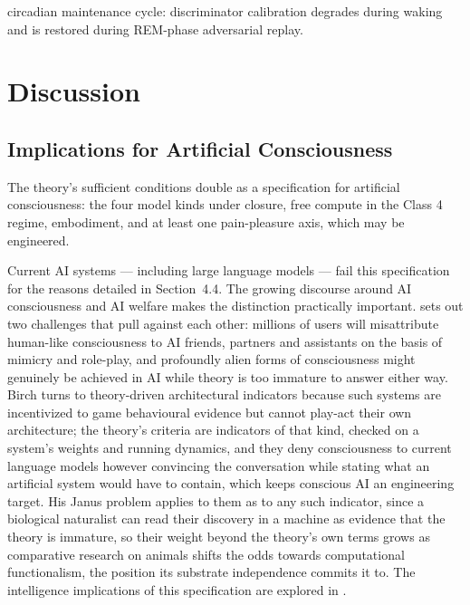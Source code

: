\documentclass[12pt]{article}
\begin{document}
circadian maintenance cycle: discriminator calibration degrades during waking and is restored during REM-phase adversarial replay.


\section{Discussion}



\subsection{Implications for Artificial Consciousness}


The theory's sufficient conditions double as a specification for artificial consciousness: the four model kinds under closure, free compute in the Class 4 regime, embodiment, and at least one pain-pleasure axis, which may be engineered.

Current AI systems --- including large language models --- fail this specification for the reasons detailed in Section~4.4. The growing discourse around AI consciousness \citep{Butlin2023,ButlinLong2026,Schwitzgebel2025} and AI welfare \citep{Long2024,Anthropic2025} makes the distinction practically important. \citet{Birch2025} sets out two challenges that pull against each other: millions of users will misattribute human-like consciousness to AI friends, partners and assistants on the basis of mimicry and role-play, and profoundly alien forms of consciousness might genuinely be achieved in AI while theory is too immature to answer either way. Birch turns to theory-driven architectural indicators because such systems are incentivized to game behavioural evidence but cannot play-act their own architecture; the theory's criteria are indicators of that kind, checked on a system's weights and running dynamics, and they deny consciousness to current language models however convincing the conversation while stating what an artificial system would have to contain, which keeps conscious AI an engineering target. His Janus problem applies to them as to any such indicator, since a biological naturalist can read their discovery in a machine as evidence that the theory is immature, so their weight beyond the theory's own terms grows as comparative research on animals shifts the odds towards computational functionalism, the position its substrate independence commits it to. The intelligence implications of this specification are explored in \citet{Gruber2026a}.
\end{document}
